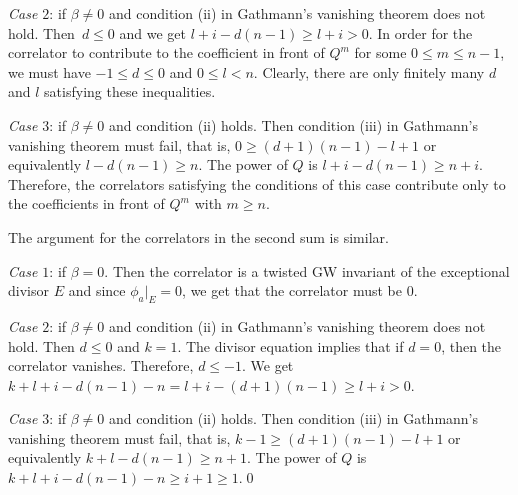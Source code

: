 \documentclass[10pt,a4paper]{article}
\numberwithin{equation}{section}
\begin{document}
{\em Case $2$}: if $\beta\neq 0$ and condition (ii) in Gathmann's
vanishing theorem does not hold. Then~${d\leq 0}$ and we get $l+i-d(n-1)\geq l+i>0$. In order for the correlator to contribute to the coefficient in front of $Q^m$ for some $0\leq m\leq n-1$, we must have $-1\leq d\leq 0$ and $0\leq l<n$. Clearly, there are only finitely many $d$ and $l$ satisfying these inequalities.

{\em Case $3$}: if $\beta\neq 0$ and condition (ii) holds. Then condition (iii) in Gathmann's vanishing theorem must fail, that is, $0\geq (d+1)(n-1)-l+1$ or equivalently $l-d(n-1)\geq n$. The power of $Q$ is $l+i-d(n-1)\geq n+i.$ Therefore, the correlators satisfying the conditions of this case contribute only to the coefficients in front of $Q^m$ with $m\geq n$.

The argument for the correlators in the second sum is similar.

{\em Case $1$}: if $\beta=0$. Then the correlator is a twisted GW invariant of the exceptional divisor $E$ and since $\phi_a|_E=0$, we get that the correlator must be $0$.

{\em Case $2$}: if $\beta\neq 0$ and condition (ii) in Gathmann's vanishing theorem does not hold. Then
$d\leq 0$ and $k=1$. The divisor equation implies that if $d=0$, then
the correlator vanishes. Therefore, $d\leq -1$. We get $k+l+i-d(n-1)-n=l+i-(d+1)(n-1)\geq l+i>0$.

{\em Case $3$}: if $\beta\neq 0$ and condition (ii) holds. Then condition (iii) in Gathmann's vanishing theorem must fail, that is, $k-1\geq (d+1)(n-1)-l+1$ or equivalently $k+l-d(n-1)\geq n+1$. The power of $Q$ is $k+l+i-d(n-1)-n\geq i+1\geq 1.$\qed
\end{document}

